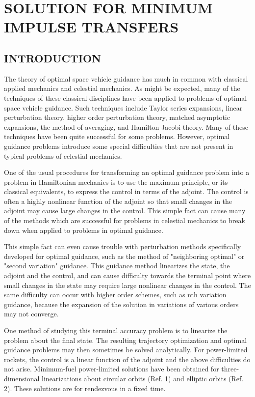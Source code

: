 \documentclass[12pt]{article}
\begin{document}
\section*{SOLUTION FOR MINIMUM IMPULSE TRANSFERS}

\subsection*{INTRODUCTION}
The theory of optimal space vehicle guidance has much in common with classical applied mechanics and celestial mechanics. As might be expected, many of the techniques of these classical disciplines have been applied to problems of optimal space vehicle guidance. Such techniques include Taylor series expansions, linear perturbation theory, higher order perturbation theory, matched asymptotic expansions, the method of averaging, and Hamilton-Jacobi theory. Many of these techniques have been quite successful for some problems. However, optimal guidance problems introduce some special difficulties that are not present in typical problems of celestial mechanics.

One of the usual procedures for transforming an optimal guidance problem into a problem in Hamiltonian mechanics is to use the maximum principle, or its classical equivalents, to express the control in terms of the adjoint. The control is often a highly nonlinear function of the adjoint so that small changes in the adjoint may cause large changes in the control. This simple fact can cause many of the methods which are successful for problems in celestial mechanics to break down when applied to problems in optimal guidance.

This simple fact can even cause trouble with perturbation methods specifically developed for optimal guidance, such as the method of "neighboring optimal" or "second variation" guidance. This guidance method linearizes the state, the adjoint and the control, and can cause difficulty towards the terminal point where small changes in the state may require large nonlinear changes in the control. The same difficulty can occur with higher order schemes, such as nth variation guidance, because the expansion of the solution in variations of various orders may not converge.

One method of studying this terminal accuracy problem is to linearize the problem about the final state. The resulting trajectory optimization and optimal guidance problems may then sometimes be solved analytically. For power-limited rockets, the control is a linear function of the adjoint and the above difficulties do not arise. Minimum-fuel power-limited solutions have been obtained for three-dimensional linearizations about circular orbits (Ref. 1) and elliptic orbits (Ref. 2). These solutions are for rendezvous in a fixed time.
\end{document}
